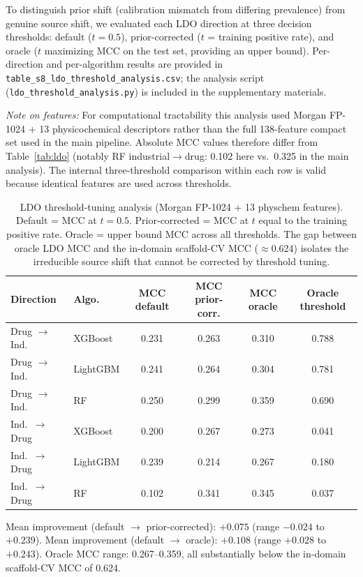 To distinguish prior shift (calibration mismatch from differing prevalence) from genuine source shift, we evaluated each LDO direction at three decision thresholds: default ($t=0.5$), prior-corrected ($t$ = training positive rate), and oracle ($t$ maximizing MCC on the test set, providing an upper bound). Per-direction and per-algorithm results are provided in \texttt{table\_s8\_ldo\_threshold\_analysis.csv}; the analysis script (\texttt{ldo\_threshold\_analysis.py}) is included in the supplementary materials.

\textit{Note on features:} For computational tractability this analysis used Morgan FP-1024 + 13 physicochemical descriptors rather than the full 138-feature compact set used in the main pipeline. Absolute MCC values therefore differ from Table~\ref{tab:ldo} (notably RF industrial$\to$drug: 0.102 here vs.\ 0.325 in the main analysis). The internal three-threshold comparison within each row is valid because identical features are used across thresholds.

\begin{table}[ht]
\caption{LDO threshold-tuning analysis (Morgan FP-1024 + 13 physchem features). Default = MCC at $t=0.5$. Prior-corrected = MCC at $t$ equal to the training positive rate. Oracle = upper bound MCC across all thresholds. The gap between oracle LDO MCC and the in-domain scaffold-CV MCC ($\approx$0.624) isolates the irreducible source shift that cannot be corrected by threshold tuning.}
\centering
\small
\begin{tabular}{@{}llcccc@{}}
\toprule
Direction & Algo. & MCC default & MCC prior-corr. & MCC oracle & Oracle threshold \\
\midrule
Drug $\to$ Ind.\ & XGBoost & 0.231 & 0.263 & 0.310 & 0.788 \\
Drug $\to$ Ind.\ & LightGBM & 0.241 & 0.264 & 0.304 & 0.781 \\
Drug $\to$ Ind.\ & RF & 0.250 & 0.299 & 0.359 & 0.690 \\
Ind.\ $\to$ Drug & XGBoost & 0.200 & 0.267 & 0.273 & 0.041 \\
Ind.\ $\to$ Drug & LightGBM & 0.239 & 0.214 & 0.267 & 0.180 \\
Ind.\ $\to$ Drug & RF & 0.102 & 0.341 & 0.345 & 0.037 \\
\bottomrule
\end{tabular}

\medskip
\footnotesize
Mean improvement (default $\to$ prior-corrected): $+0.075$ (range $-0.024$ to $+0.239$).
Mean improvement (default $\to$ oracle): $+0.108$ (range $+0.028$ to $+0.243$).
Oracle MCC range: 0.267--0.359, all substantially below the in-domain scaffold-CV MCC of 0.624.
\end{table}
